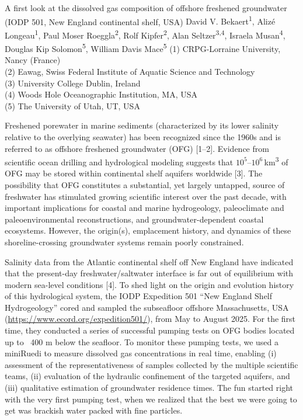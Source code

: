 \begin{conf-abstract}
{A first look at the dissolved gas composition of offshore freshened groundwater (IODP 501, New England continental shelf, USA)}
{David V. Bekaert\textsuperscript{1}, Alizé Longeau\textsuperscript{1}, Paul Moser Roeggla\textsuperscript{2}, Rolf Kipfer\textsuperscript{2}, Alan Seltzer\textsuperscript{3,4}, Israela Musan\textsuperscript{4}, Douglas Kip Solomon\textsuperscript{5}, William Davis Mace\textsuperscript{5}}
{(1) CRPG-Lorraine University, Nancy (France)\\
(2) Eawag, Swiss Federal Institute of Aquatic Science and Technology\\
(3) University College Dublin, Ireland\\
(4) Woods Hole Oceanographic Institution, MA, USA\\
(5) The University of Utah, UT, USA
}
{Freshened porewater in marine sediments (characterized by its lower salinity relative to the overlying seawater) has been recognized since the 1960s and is referred to as offshore freshened groundwater (OFG) [1–2]. Evidence from scientific ocean drilling and hydrological modeling suggests that $10^5$--$10^6$\,km\textsuperscript{3} of OFG may be stored within continental shelf aquifers worldwide [3]. The possibility that OFG constitutes a substantial, yet largely untapped, source of freshwater has stimulated growing scientific interest over the past decade, with important implications for coastal and marine hydrogeology, paleoclimate and paleoenvironmental reconstructions, and groundwater-dependent coastal ecosystems. However, the origin(s), emplacement history, and dynamics of these shoreline-crossing groundwater systems remain poorly constrained.

Salinity data from the Atlantic continental shelf off New England have indicated that the present-day freshwater/saltwater interface is far out of equilibrium with modern sea-level conditions [4]. To shed light on the origin and evolution history of this hydrological system, the IODP Expedition 501 ``New England Shelf Hydrogeology'' cored and sampled the subseafloor offshore Massachusetts, USA (\url{https://www.ecord.org/expedition501/}), from May to August 2025. For the first time, they conducted a series of successful pumping tests on OFG bodies located up to ~400 m below the seafloor. To monitor these pumping tests, we used a miniRuedi to measure dissolved gas concentrations in real time, enabling (i) assessment of the representativeness of samples collected by the multiple scientific teams, (ii) evaluation of the hydraulic confinement of the targeted aquifers, and (iii) qualitative estimation of groundwater residence times. The fun started right with the very first pumping test, when we realized that the best we were going to get was brackish water packed with fine particles.

}
\end{conf-abstract}
